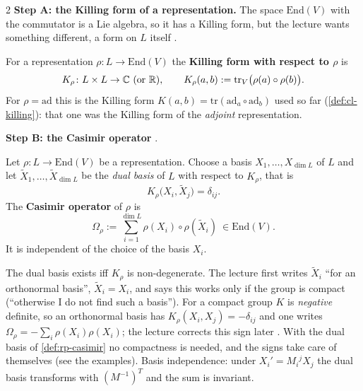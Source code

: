\begin{paracol}{2}
\textbf{Step A: the Killing form of a representation.}  The space $\mathrm{End}(V)$ with the commutator is a Lie algebra, so it has a Killing form, but the lecture wants something different, a form on $L$ itself  .
\begin{definition}\label{def:rp-killing}
For a representation $\rho\colon L\to\mathrm{End}(V)$ the \textbf{Killing form with respect to $\rho$} is
\[
  K_\rho\colon L\times L\to\mathbb{C}\ (\text{or }\mathbb{R}),\qquad K_\rho(a,b):=\mathrm{tr}_V\bigl(\rho(a)\circ\rho(b)\bigr).
\]
For $\rho=\mathrm{ad}$ this is the Killing form $K(a,b)=\mathrm{tr}(\mathrm{ad}_a\circ\mathrm{ad}_b)$ used so far (\cref{def:cl-killing}): that one was the Killing form of the \emph{adjoint} representation.   
\end{definition}
\textbf{Step B: the Casimir operator}  .
\begin{definition}\label{def:rp-casimir}
Let $\rho\colon L\to\mathrm{End}(V)$ be a representation. Choose a basis $X_1,\dots,X_{\dim L}$ of $L$ and let $\tilde X_1,\dots,\tilde X_{\dim L}$ be the \emph{dual basis} of $L$ with respect to $K_\rho$, that is
\[
  K_\rho\bigl(X_i,\tilde X_j\bigr)=\delta_{ij}.
\]
The \textbf{Casimir operator} of $\rho$ is
\[
  \Omega_\rho:=\sum_{i=1}^{\dim L}\rho(X_i)\circ\rho(\tilde X_i)\ \in\mathrm{End}(V).
\]
It is independent of the choice of the basis $X_i$.     
\end{definition}
\begin{coursenote}
The dual basis exists iff $K_\rho$ is non-degenerate. The lecture first writes $\tilde X_i$ ``for an orthonormal basis'', $\tilde X_i=X_i$, and says this works only if the group is compact (``otherwise I do not find such a basis''). For a compact group $K$ is \emph{negative} definite, so an orthonormal basis has $K_\rho(X_i,X_j)=-\delta_{ij}$ and one writes $\Omega_\rho=-\sum_i\rho(X_i)\rho(X_i)$; the lecture corrects this sign later  . With the dual basis of \cref{def:rp-casimir} no compactness is needed, and the signs take care of themselves (see the examples). Basis independence: under $X_i'=M_i{}^jX_j$ the dual basis transforms with $(M^{-1})^T$ and the sum is invariant.  

\end{coursenote}
\end{paracol}
